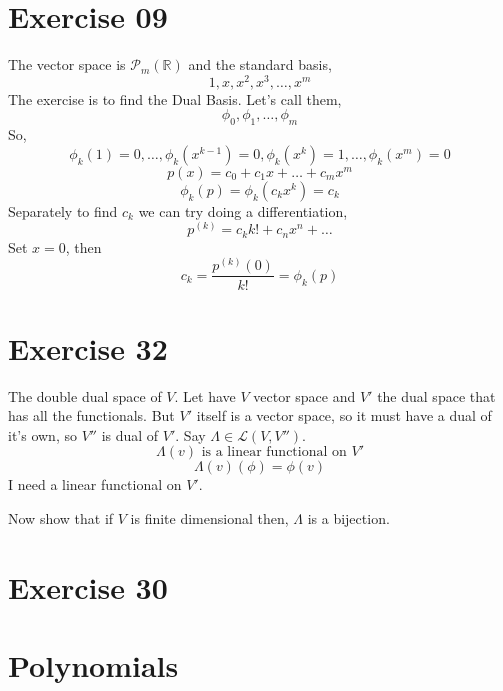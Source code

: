 \documentclass[letter]{article}
\begin{document}
\section*{Exercise 09}
The vector space is $\mathcal P_m (\mathbb{R})$ and the standard basis, 
\[
1, x, x^2, x^3, \ldots, x^{m}
\] 
The exercise is to find the Dual Basis. Let's call them, 
\[
\phi_0, \phi_1 ,\ldots, \phi_m
\] 
So, 
\[
	\phi_k(1) = 0, \ldots,  \phi_{k} (x^{k-1}) = 0, \phi_{k} (x^{k}) = 1, \ldots, \phi_k (x^{m})=0
\]
\[
p(x) = c_0 + c_1 x + \ldots + c_m x^{m}
\] 
\[
\phi_k( p) = \phi_k (c_k x^{k}) = c_k 
\] 
Separately to find $c_k$ we can try doing a differentiation, 
\[
p^{(k)} = c_k k! + c_n x^{n} + \ldots 
\]
Set $x=0$, then 
\[
c_k = \frac{p^{(k) } (0)}{k!} = \phi_k (p)
\] 


\section*{Exercise 32} 
The double dual space of $V$. Let have $V$ vector space and $V'$ the dual space that has all the functionals. But $V'$ itself is a vector space, so it must have a dual of it's own, so $V''$ is dual of $V'$. 
Say $\Lambda \in \mathcal L (V , V'' )$. 
\[
\Lambda (v) \text{ is a linear functional on } V'
\]
\[
\Lambda (v) (\phi)  = \phi(v)
\] 
I need a linear functional on $V'$. 

Now show that if $V$ is finite dimensional then, $\Lambda$ is a bijection. 

\section*{Exercise 30} 


\section*{Polynomials}
\end{document}
